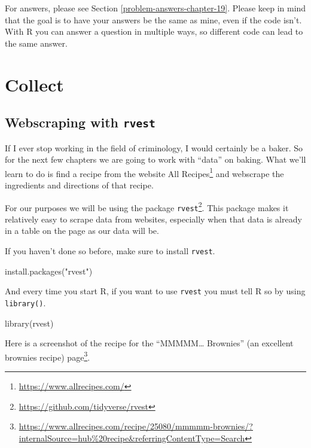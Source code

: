 \documentclass[
]{krantz}
\makeatletter
\newenvironment{Shaded}{\begin{snugshade}}{\end{snugshade}}
\newcommand{\FunctionTok}[1]{\textcolor[rgb]{0,0,0}{#1}}
\newcommand{\NormalTok}[1]{#1}
\newcommand{\StringTok}[1]{\textcolor[rgb]{0.5,0.5,0.5}{#1}}
\renewcommand{\href}[2]{#2\footnote{\url{#1}}}
\newenvironment{kframe}{%
\medskip{}
\setlength{\fboxsep}{.8em}
 \def\at@end@of@kframe{}%
 \ifinner\ifhmode%
  \def\at@end@of@kframe{\end{minipage}}%
  \begin{minipage}{\columnwidth}%
 \fi\fi%
 \def\FrameCommand##1{\hskip\@totalleftmargin \hskip-\fboxsep
 \colorbox{shadecolor}{##1}\hskip-\fboxsep
     \hskip-\linewidth \hskip-\@totalleftmargin \hskip\columnwidth}%
 \MakeFramed {\advance\hsize-\width
   \@totalleftmargin\z@ \linewidth\hsize
   \@setminipage}}%
 {\par\unskip\endMakeFramed%
 \at@end@of@kframe}
\renewenvironment{Shaded}{\begin{kframe}}{\end{kframe}}
\makeatother
\begin{document}
For answers, please see Section \ref{problem-answers-chapter-19}. Please keep in mind that the goal is to have your answers be the same as mine, even if the code isn't. With R you can answer a question in multiple ways, so different code can lead to the same answer.

\hypertarget{part-collect}{%
\part{Collect}\label{part-collect}}

\hypertarget{webscraping-with-rvest}{%
\chapter{\texorpdfstring{Webscraping with \texttt{rvest}}{Webscraping with rvest}}\label{webscraping-with-rvest}}

If I ever stop working in the field of criminology, I would certainly be a baker. So for the next few chapters we are going to work with ``data'' on baking. What we'll learn to do is find a recipe from the website \href{https://www.allrecipes.com/}{All Recipes} and webscrape the ingredients and directions of that recipe.

For our purposes we will be using the package \href{https://github.com/tidyverse/rvest}{\texttt{rvest}}. This package makes it relatively easy to scrape data from websites, especially when that data is already in a table on the page as our data will be.

If you haven't done so before, make sure to install \texttt{rvest}.

\begin{Shaded}
\begin{Highlighting}[]
\FunctionTok{install.packages}\NormalTok{(}\StringTok{"rvest"}\NormalTok{)}
\end{Highlighting}
\end{Shaded}

And every time you start R, if you want to use \texttt{rvest} you must tell R so by using \texttt{library()}.

\begin{Shaded}
\begin{Highlighting}[]
\FunctionTok{library}\NormalTok{(rvest)}
\end{Highlighting}
\end{Shaded}

Here is a screenshot of the recipe for the ``MMMMM\ldots{} Brownies'' (an excellent brownies recipe) \href{https://www.allrecipes.com/recipe/25080/mmmmm-brownies/?internalSource=hub\%20recipe\&referringContentType=Search}{page}.
\end{document}
